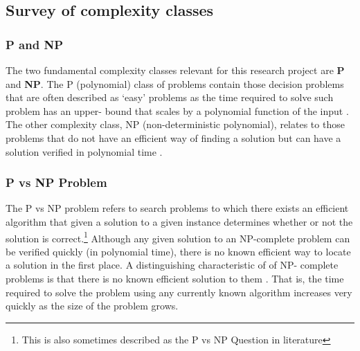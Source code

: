 \documentclass[11pt, a4paper, oneside]{report} %
\begin{document}
\subsection{Survey of complexity classes}

\subsubsection{P and NP}

The two fundamental complexity classes relevant for this research project are
\textbf{P} and \textbf{NP}\@. The P (polynomial) class of problems contain those
decision problems that are often described as `easy' problems
\cite{kendall2008survey} as the time required to solve such problem has an
upper- bound that scales by a polynomial function of the input
\cite{sipser2012introduction}. The other complexity class, NP (non-deterministic
polynomial), relates to those problems that do not have an efficient way of
finding a solution but can have a solution verified in polynomial time
\cite{Goldreich:2008, Papadimitriou:2003:CC:1074100.1074233}.





\subsubsection{P vs NP Problem}

The P vs NP problem refers to search problems to which there exists an efficient
algorithm that given a solution to a given instance determines whether or not
the solution is correct\cite{sipser2012introduction,Goldreich:2008,kendall2008su
rvey,du2011theory}.\footnote{This is also sometimes described as the P vs NP
Question in literature} Although any given solution to an NP-complete problem
can be verified quickly (in polynomial time), there is no known efficient way to
locate a solution in the first place. A distinguishing characteristic of of NP-
complete problems is that there is no known efficient solution to them
\cite{Goldreich:2008}. That is, the time required to solve the problem using any
currently known algorithm increases very quickly as the size of the problem
grows.
\end{document}
